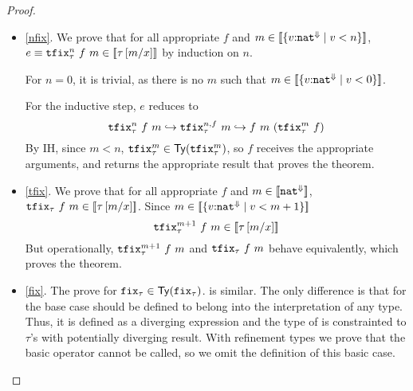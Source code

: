 \begin{proof}
\begin{itemize}
\item \ref{nfix}.
We prove that for all
appropriate $f$
and $ m \in \interp{\tref{v}{\tnat}{\lfinite}{v < n}}$,
$e \equiv \etfixn{\tau}{f}{n}\ f \ m \in \interp{\tau\sub{x}{m}}$
% 
by induction on $n$.

For $n=0$, 
it is trivial, as 
there is no $m$ such that
$m \in \interp{\tref{v}{\tnat}{\lfinite}{v < 0}}$.

For the inductive step, $e$ reduces to 
$$
\etfixn{\tau}{f}{n}\ f\ m 
\hookrightarrow
\etfixfn{\tau}{f}{n}\ m 
\hookrightarrow
f\ m\ (\etfixn{\tau}{f}{m}\ f)\\
$$
By IH, since $m < n$,
$\etfixn{\tau}{f}{m} \in \constty{\etfixn{\tau}{f}{m}}$, 
so $f$ receives the appropriate arguments, 
and returns the appropriate result that proves the theorem.
%
\item \ref{tfix}.
We prove that 
for all appropriate $f$
and     $ m \in \interp{\tnat^\lfinite}$,
$\etfix{\tau}\ f \ m \in \interp{\tau\sub{x}{m}}$.
%
Since $m \in \interp{\tref{v}{\tnat}{\lfinite}{v < m+1}}$
$$\etfixn{\tau}{f}{m+1}\ f \ m \in \interp{\tau\sub{x}{m}}$$
%
But operationally, 
$\etfixn{\tau}{f}{m+1}\ f \ m$
and
$\etfix{\tau}\ f \ m$
behave equivalently, which proves the theorem.
\item \ref{fix}. The prove for 
$\efix{\tau} \in \constty{\efix{\tau}}$.
is similar.
%
The only difference is that for the base case
 should be defined to belong 
into the interpretation of any type.
%
Thus, it is defined as a diverging expression
and the type of \efix{\tau} is constrainted
to $\tau$'s with potentially diverging result. 
%
With refinement types we prove that the basic
 operator
cannot be called, so we omit 
the definition of this basic case.
\end{itemize}
\end{proof}
%

